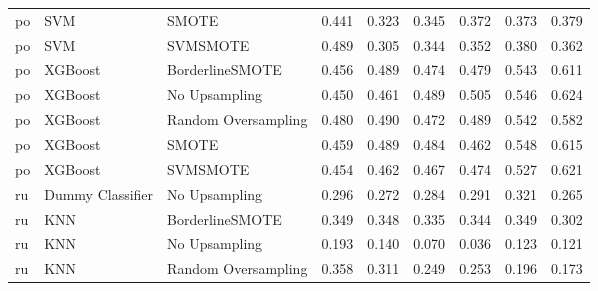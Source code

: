 \begin{tabular}{lllllllll}
      po &                          SVM &               SMOTE & 0.441 &                     0.323 &                 0.345 &                  0.372 &                                   0.373 &     0.379 \\
      po &                          SVM &            SVMSMOTE & 0.489 &                     0.305 &                 0.344 &                  0.352 &                                   0.380 &     0.362 \\
      po &                      XGBoost &     BorderlineSMOTE & 0.456 &                     0.489 &                 0.474 &                  0.479 &                                   0.543 &     0.611 \\
      po &                      XGBoost &       No Upsampling & 0.450 &                     0.461 &                 0.489 &                  0.505 &                                   0.546 &     0.624 \\
      po &                      XGBoost & Random Oversampling & 0.480 &                     0.490 &                 0.472 &                  0.489 &                                   0.542 &     0.582 \\
      po &                      XGBoost &               SMOTE & 0.459 &                     0.489 &                 0.484 &                  0.462 &                                   0.548 &     0.615 \\
      po &                      XGBoost &            SVMSMOTE & 0.454 &                     0.462 &                 0.467 &                  0.474 &                                   0.527 &     0.621 \\
      ru &             Dummy Classifier &       No Upsampling & 0.296 &                     0.272 &                 0.284 &                  0.291 &                                   0.321 &     0.265 \\
      ru &                          KNN &     BorderlineSMOTE & 0.349 &                     0.348 &                 0.335 &                  0.344 &                                   0.349 &     0.302 \\
      ru &                          KNN &       No Upsampling & 0.193 &                     0.140 &                 0.070 &                  0.036 &                                   0.123 &     0.121 \\
      ru &                          KNN & Random Oversampling & 0.358 &                     0.311 &                 0.249 &                  0.253 &                                   0.196 &     0.173 \\

\end{tabular}
